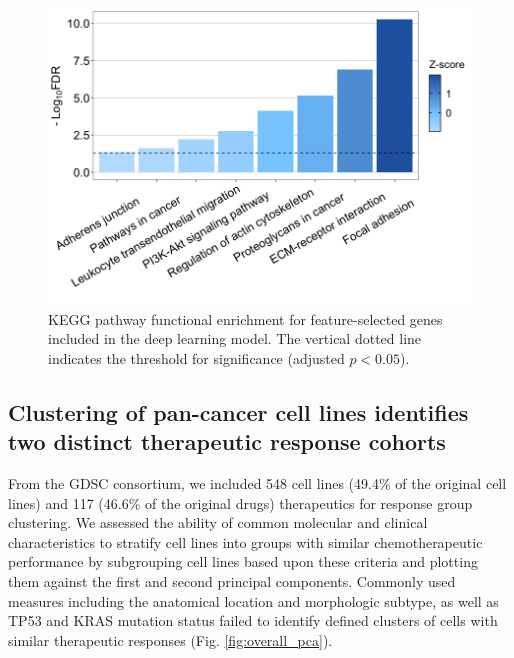 \documentclass[10pt, letterpaper]{article}
\begin{document}
\begin{multicols*}{2}
\begin{figure}[!ht]
	\centering
	\includegraphics[width=\textwidth]{Figures/kegg.png}
	\caption{KEGG pathway functional enrichment for feature-selected genes included in the deep learning model. The vertical dotted line indicates the threshold for significance (adjusted $p < 0.05$).}
	\label{fig:kegg}
\end{figure}

\subsection*{Clustering of pan-cancer cell lines identifies two distinct therapeutic response cohorts}
From the GDSC consortium, we included 548 cell lines (49.4\% of the original cell lines) and 117 (46.6\% of the original drugs) therapeutics for response group clustering. We assessed the ability of common molecular and clinical characteristics to stratify cell lines into groups with similar chemotherapeutic performance by subgrouping cell lines based upon these criteria and plotting them against the first and second principal components. Commonly used measures including the anatomical location and morphologic subtype, as well as TP53 and KRAS mutation status failed to identify defined clusters of cells with similar therapeutic responses (Fig. \ref{fig:overall_pca}).


\end{multicols*}
\end{document}
